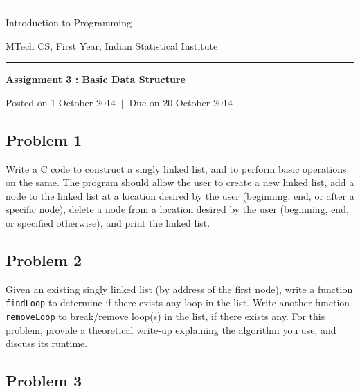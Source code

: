 \documentclass[11pt,a4paper]{article}
\begin{document}
\pagestyle{empty}

\begin{center}
  \hrule
  \vspace*{10pt}
  
  {\huge Introduction to Programming}

  \vspace*{10pt}

  {\large MTech CS, First Year, Indian Statistical Institute}
  
  \vspace*{10pt}  
  \hrule
  \vspace*{20pt}
  
  \textbf{\Large Assignment 3 : Basic Data Structure}

  Posted on 1 October 2014 $ \ \vert \ $ Due on 20 October 2014

  \vspace*{10pt}
  
\end{center}



\subsection*{Problem 1}

Write a C code to construct a singly linked list, and to perform basic operations on the same. The program should allow the user to create a new linked list, add a node to the linked list at a location desired by the user (beginning, end, or after a specific node), delete a node from a location desired by the user (beginning, end, or specified otherwise), and print the linked list.


\subsection*{Problem 2}

Given an existing singly linked list (by address of the first node), write a function \texttt{findLoop} to determine if there exists any loop in the list. Write another function \texttt{removeLoop} to break/remove loop(s) in the list, if there exists any. For this problem, provide a theoretical write-up explaining the algorithm you use, and discuss its runtime.


\subsection*{Problem 3}
\end{document}
